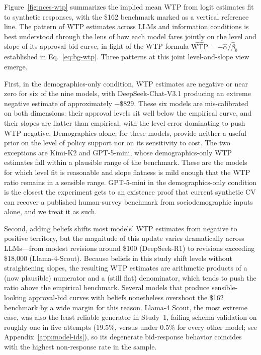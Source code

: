 \documentclass[12pt]{article}
\begin{document}
Figure~\ref{fig:nces-wtp} summarizes the implied mean WTP from logit
estimates fit to synthetic responses, with the \$162 benchmark marked as
a vertical reference line. The pattern of WTP estimates across LLMs and
information conditions is best understood through the lens of how each
model fares jointly on the level and slope of its approval-bid curve, in
light of the WTP formula $\widehat{\text{WTP}} = -\hat{\alpha}/\hat{\beta}_b$
established in Eq.~\ref{eq:bg-wtp}. Three patterns at this joint
level-and-slope view emerge.

First, in the demographics-only condition, WTP estimates are negative or
near zero for six of the nine models, with DeepSeek-Chat-V3.1 producing
an extreme negative estimate of approximately $-\$829$. These
six models are mis-calibrated on both dimensions: their approval levels
sit well below the empirical curve, and their slopes are flatter than
empirical, with the level error dominating to push WTP negative.
Demographics alone, for these models, provide neither a useful prior on
the level of policy support nor on its sensitivity to cost. The two
exceptions are Kimi-K2 and GPT-5-mini, whose demographics-only WTP
estimates fall within a plausible range of the benchmark. These are the
models for which level fit is reasonable and slope flatness is mild
enough that the WTP ratio remains in a sensible range. GPT-5-mini in the
demographics-only condition is the closest the experiment gets to an
existence proof that current synthetic CV can recover a published
human-survey benchmark from sociodemographic inputs alone, and we treat
it as such.

Second, adding beliefs shifts most models' WTP estimates from negative
to positive territory, but the magnitude of this update varies
dramatically across LLMs---from modest revisions around \$100
(DeepSeek-R1) to revisions exceeding \$18,000
(Llama-4-Scout). Because beliefs in this study shift levels
without straightening slopes, the resulting WTP estimates are arithmetic
products of a (now plausible) numerator and a (still flat) denominator,
which tends to push the ratio above the empirical benchmark. Several
models that produce sensible-looking approval-bid curves with beliefs
nonetheless overshoot the \$162 benchmark by a wide margin for this
reason. Llama-4 Scout, the most extreme case, was also the least reliable
generator in Study~1, failing schema validation on roughly one in five
attempts (19.5\%, versus under 0.5\% for every other model; see
Appendix~\ref{app:model-ids}), so its degenerate bid-response behavior
coincides with the highest non-response rate in the sample.
\end{document}
